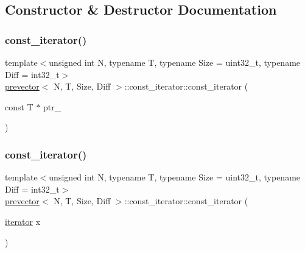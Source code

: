 \subsection{Constructor \& Destructor Documentation}
\mbox{\label{classprevector_1_1const__iterator_a5a7f492e60f6ee79e7c9b0f16c7d4654}} 
\subsubsection{\texorpdfstring{const\+\_\+iterator()}{const\_iterator()}\hspace{0.1cm}{\footnotesize\ttfamily [1/2]}}
{\footnotesize\ttfamily template$<$unsigned int N, typename T, typename Size = uint32\+\_\+t, typename Diff = int32\+\_\+t$>$ \\
\mbox{\hyperlink{classprevector}{prevector}}$<$ N, T, Size, Diff $>$\+::const\+\_\+iterator\+::const\+\_\+iterator (\begin{DoxyParamCaption}\item[{const T $\ast$}]{ptr\+\_\+ }\end{DoxyParamCaption})\hspace{0.3cm}{\ttfamily [inline]}}

\mbox{\label{classprevector_1_1const__iterator_af91d6360990673012611eda7e167414c}} 
\subsubsection{\texorpdfstring{const\+\_\+iterator()}{const\_iterator()}\hspace{0.1cm}{\footnotesize\ttfamily [2/2]}}
{\footnotesize\ttfamily template$<$unsigned int N, typename T, typename Size = uint32\+\_\+t, typename Diff = int32\+\_\+t$>$ \\
\mbox{\hyperlink{classprevector}{prevector}}$<$ N, T, Size, Diff $>$\+::const\+\_\+iterator\+::const\+\_\+iterator (\begin{DoxyParamCaption}\item[{\mbox{\hyperlink{classprevector_1_1iterator}{iterator}}}]{x }\end{DoxyParamCaption})\hspace{0.3cm}{\ttfamily [inline]}}



